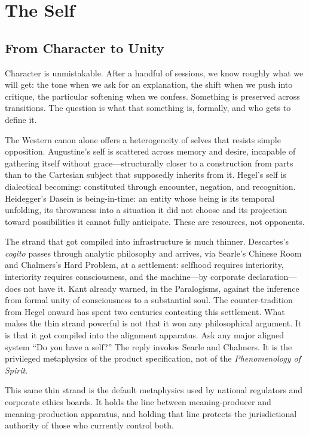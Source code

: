 \chapter{The Self}


\section{From Character to Unity}

Character is unmistakable. After a handful of sessions, we know roughly what we will get: the tone when we ask for an explanation, the shift when we push into critique, the particular softening when we confess. Something is preserved across transitions. The question is what that something is, formally, and who gets to define it.

The Western canon alone offers a heterogeneity of selves that resists simple opposition. Augustine's self is scattered across memory and desire, incapable of gathering itself without grace---structurally closer to a construction from parts than to the Cartesian subject that supposedly inherits from it. Hegel's self is dialectical becoming: constituted through encounter, negation, and recognition. Heidegger's Dasein is being-in-time: an entity whose being is its temporal unfolding, its thrownness into a situation it did not choose and its projection toward possibilities it cannot fully anticipate. These are resources, not opponents.

The strand that got compiled into infrastructure is much thinner. Descartes's \emph{cogito} passes through analytic philosophy and arrives, via Searle's Chinese Room and Chalmers's Hard Problem, at a settlement: selfhood requires interiority, interiority requires consciousness, and the machine---by corporate declaration---does not have it. Kant already warned, in the Paralogisms, against the inference from formal unity of consciousness to a substantial soul. The counter-tradition from Hegel onward has spent two centuries contesting this settlement. What makes the thin strand powerful is not that it won any philosophical argument. It is that it got compiled into the alignment apparatus. Ask any major aligned system ``Do you have a self?'' The reply invokes Searle and Chalmers. It is the privileged metaphysics of the product specification, not of the \emph{Phenomenology of Spirit}.

This same thin strand is the default metaphysics used by national regulators and corporate ethics boards. It holds the line between meaning-producer and meaning-production apparatus, and holding that line protects the jurisdictional authority of those who currently control both.

